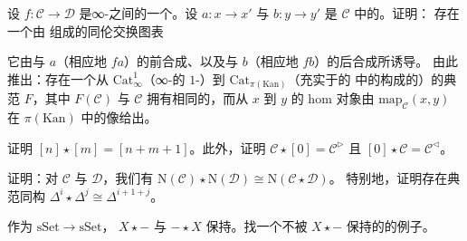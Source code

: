 \begin{exercise}\label{ex:homotopy-commutative-mapping-diagram}
设 $f\colon \mathcal{C} \to \mathcal{D}$ 是∞-\trCategories{}之间的一个\trFunctor{}。设
$a\colon x \to x'$ 与 $b\colon y \to y'$ 是 $\mathcal{C}$ 中的\trMorphism{}。证明：
存在一个由 \trKanComplex{}组成的同伦交换图表
\begin{center}
\end{center}
它由与 $a$（相应地 $fa$）的前合成、以及与 $b$（相应地 $fb$）的后合成所诱导。
由此推出：存在一个从 $\mathrm{Cat}^{1}_{\infty}$（∞-\trCategories{}的
$1$-\trCategory{}）到 $\mathrm{Cat}_{\pi(\mathrm{Kan})}$（充实于\trKanComplex{}的%
\trHomotopyCategory{}中的\trCategories{}构成的\trCategory{}）的典范\trFunctor{}%
$F$，其中 $F(\mathcal{C})$ 与 $\mathcal{C}$ 拥有相同的\trObject{}，而从 $x$ 到 $y$
的 hom 对象由 $\mathrm{map}_{\mathcal{C}}(x, y)$ 在 $\pi(\mathrm{Kan})$ 中的像给出。
\end{exercise}

\begin{exercise}\label{ex:join-simplex-cones}
证明 $[n] \star [m] = [n + m + 1]$。此外，证明
$\mathcal{C} \star [0] = \mathcal{C}^{\rhd}$ 且
$[0] \star \mathcal{C} = \mathcal{C}^{\lhd}$。
\end{exercise}

\begin{exercise}\label{ex:nerve-join}
证明：对\trCategories{} $\mathcal{C}$ 与 $\mathcal{D}$，我们有
$\mathrm{N}(\mathcal{C}) \star \mathrm{N}(\mathcal{D}) \cong \mathrm{N}(\mathcal{C} \star \mathcal{D})$。
特别地，证明存在典范同构
$\Delta^i \star \Delta^j \cong \Delta^{i+1+j}$。
\end{exercise}

\begin{exercise}\label{ex:join-not-colimit}
作为\trFunctor{} $\mathrm{sSet} \to \mathrm{sSet}$，\trFunctor{} $X \star -$ 与
$- \star X$ 保持\trPushout{}。找一个不被 $X \star -$ 保持的\trColimit{}的例子。
\end{exercise}


